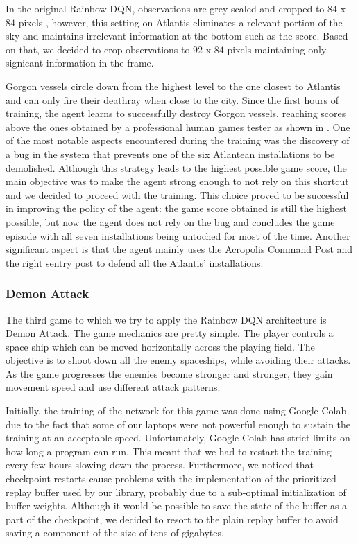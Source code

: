 \documentclass[10pt,twocolumn,letterpaper]{article}
\begin{document}
In the original Rainbow DQN, observations are grey-scaled and cropped to $84$ x $84$ pixels \cite{DBLP:journals/corr/abs-1710-02298}, however, this setting on Atlantis eliminates a relevant portion of the sky and maintains irrelevant information at the bottom such as the score. Based on that, we decided to crop observations to $92$ x $84$ pixels maintaining only signicant information in the frame.

Gorgon vessels circle down from the highest level to the one closest to Atlantis and can only fire their deathray when close to the city. Since the first hours of training, the agent learns to successfully destroy Gorgon vessels, reaching scores above the ones obtained by a professional human games tester as shown in \cite{humancontrol}.  One of the most notable aspects encountered during the training was the discovery of a bug in the system that prevents one of the six Atlantean installations to be demolished. Although this strategy leads to the highest possible game score, the main objective was to make the agent strong enough to not rely on this shortcut and we decided to proceed with the training. This choice proved to be successful in improving the policy of the agent: the game score obtained is still the highest possible, but now the agent does not rely on the bug and concludes the game episode with all seven installations being untoched for most of the time. Another significant aspect is that the agent mainly uses the Acropolis Command Post and the right sentry post to defend all the Atlantis' installations.

\subsubsection{Demon Attack}
\label{demon_attack}
The third game to which we try to apply the Rainbow DQN architecture is Demon Attack. The game mechanics are pretty simple. The player controls a space ship which can be moved horizontally across the playing field. The objective is to shoot down all the enemy spaceships, while avoiding their attacks. As the game progresses the enemies become stronger and stronger, they gain movement speed and use different attack patterns.

Initially, the training of the network for this game was done using Google Colab due to the fact that some of our laptops were not powerful enough to sustain the training at an acceptable speed. Unfortunately, Google Colab has strict limits on how long a program can run. This meant that we had to restart the training every few hours slowing down the process. Furthermore, we noticed that checkpoint restarts cause problems with the implementation of the prioritized replay buffer used by our library, probably due to a sub-optimal initialization of buffer weights. Although it would be possible to save the state of the buffer as a part of the checkpoint, we decided to resort to the plain replay buffer to avoid saving a component of the size of tens of gigabytes.
\end{document}
